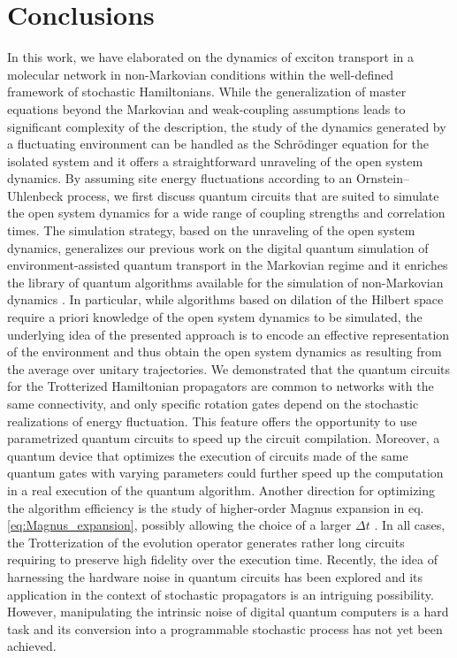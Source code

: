 \documentclass[12pt, amsmath, amssymb, graphicx]{iopart}
\begin{document}
\section{\label{sec:Conclusions}Conclusions}
In this work, we have elaborated on the dynamics of exciton transport in a molecular network in non-Markovian conditions within the well-defined framework of stochastic Hamiltonians.
While the generalization of master equations beyond the Markovian and weak-coupling assumptions leads to significant complexity of the description, the study of the dynamics generated by a fluctuating environment can be handled as the Schr\"odinger equation for the isolated system and it offers a straightforward unraveling of the open system dynamics.
By assuming site energy fluctuations according to an Ornstein–Uhlenbeck process, we first discuss quantum circuits that are suited to simulate the open system dynamics for a wide range of coupling strengths and correlation times.
The simulation strategy, based on the unraveling of the open system dynamics, generalizes our previous work on the digital quantum simulation of environment-assisted quantum transport in the Markovian regime \cite{Gallina2022} and it enriches the library of quantum algorithms available for the simulation of non-Markovian dynamics \cite{Wang2023,Head-Marsden2021}.
In particular, while algorithms based on dilation of the Hilbert space require a priori knowledge of the open system dynamics to be simulated, the underlying idea of the presented approach is to encode an effective representation of the environment and thus obtain the open system dynamics as resulting from the average over unitary trajectories.
We demonstrated that the quantum circuits for the Trotterized Hamiltonian propagators are common to networks with the same connectivity, and only specific rotation gates depend on the stochastic realizations of energy fluctuation. This feature offers the opportunity to use parametrized quantum circuits to speed up the circuit compilation. Moreover, a quantum device that optimizes the execution of circuits made of the same quantum gates with varying parameters could further speed up the computation in a real execution of the quantum algorithm.
Another direction for optimizing the algorithm efficiency is the study of higher-order Magnus expansion in eq. \ref{eq:Magnus_expansion}, possibly allowing the choice of a larger $\Delta t$ \cite{Ture2024}.
In all cases, the Trotterization of the evolution operator generates rather long circuits requiring to preserve high fidelity over the execution time.
Recently, the idea of harnessing the hardware noise in quantum circuits has been explored \cite{Tolunay2023, Sun2024, Guimaraes2023} and its application in the context of stochastic propagators is an intriguing possibility.
However, manipulating the intrinsic noise of digital quantum computers is a hard task and its conversion into a programmable stochastic process has not yet been achieved.
\end{document}
